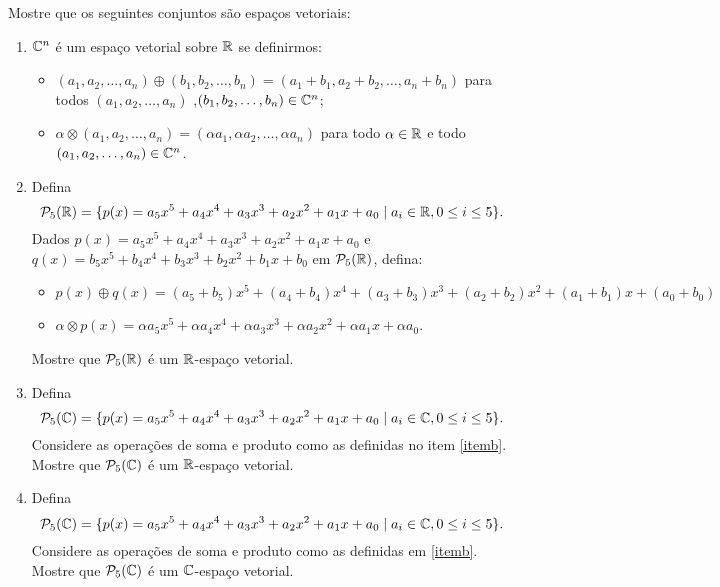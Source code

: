 \documentclass[12pt]{exam}
\begin{document}
\begin{exercicio}
  Mostre que os seguintes conjuntos são espaços vetoriais:
  \begin{enumerate}[label={\alph*})]
    \item $\mathbb{C}^n$ é um espaço vetorial sobre $\mathbb{R}$ se definirmos:
    \begin{itemize}
      \item $(a_1, a_2, \dots, a_n) \oplus (b_1, b_2, \dots,b_n) = (a_1 + b_1, a_2 + b_2,\dots, a_n + b_n)$ para todos $(a_1, a_2, \dots,a_n)$ ,$(b_1, b_2, \dots,b_n) \in \mathbb{C}^n$;

      \item $\alpha \otimes (a_1, a_2, \dots,a_n) = (\alpha a_1, \alpha a_2, \dots, \alpha a_n)$ para todo $\alpha \in \mathbb{R}$ e todo $(a_1, a_2, \dots, a_n) \in \mathbb{C}^n$.
    \end{itemize}

    \item\label{itemb} Defina
    \[
      \mathcal{P}_5(\mathbb{R}) = \{ p(x) = a_5x^5 + a_4x^4 + a_3x^3 + a_2x^2 + a_1x + a_0 \mid a_i \in \mathbb{R}, 0 \le i \le 5 \}.
    \]
     Dados $p(x) = a_5x^5 + a_4x^4 + a_3x^3 + a_2x^2 + a_1x + a_0$ e $q(x) = b_5x^5 + b_4x^4 + b_3x^3 + b_2x^2 + b_1x + b_0$ em $\mathcal{P}_5(\mathbb{R})$, defina:
    \begin{itemize}
      \item $p(x) \oplus q(x) =  (a_5 + b_5)x^5 + (a_4 + b_4)x^4 + (a_3 + b_ 3)x^3 + (a_2 + b_2)x^2 + (a_1 + b_1)x + (a_0 + b_0)$
      \item $\alpha\otimes p(x) = \alpha a_5x^5 + \alpha a_4x^4 + \alpha a_3x^3 + \alpha a_2x^2 + \alpha a_1x + \alpha a_0$.
    \end{itemize}

   Mostre que $\mathcal{P}_5(\mathbb{R})$ é um $\mathbb{R}$-espaço vetorial.

    \item Defina
    \[
      \mathcal{P}_5(\mathbb{C}) = \{ p(x) = a_5x^5 + a_4x^4 + a_3x^3 + a_2x^2 + a_1x + a_0 \mid a_i \in \mathbb{C}, 0 \le i \le 5 \}.
    \]
    Considere as operações de soma e produto como as definidas no item \ref{itemb}. Mostre que $\mathcal{P}_5(\mathbb{C})$ é um $\mathbb{R}$-espaço vetorial.

    \item Defina
    \[
      \mathcal{P}_5(\mathbb{C}) = \{ p(x) = a_5x^5 + a_4x^4 + a_3x^3 + a_2x^2 + a_1x + a_0 \mid a_i \in \mathbb{C}, 0 \le i \le 5 \}.
    \]
    Considere as operações de soma e produto como as definidas em \ref{itemb}. Mostre que $\mathcal{P}_5(\mathbb{C})$ é um $\mathbb{C}$-espaço vetorial.


\end{enumerate}
\end{exercicio}
\end{document}
